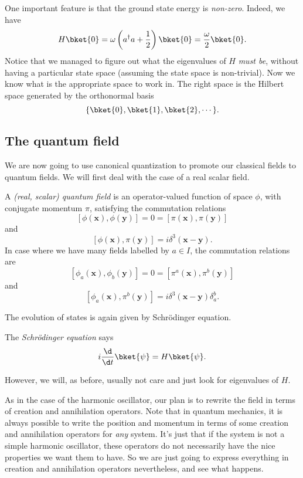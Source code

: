 \documentclass[a4paper]{article}
\begin{document}
One important feature is that the ground state energy is \emph{non-zero}. Indeed, we have
\[
  H \bket{0} = \omega\left(a^\dagger a + \frac{1}{2}\right)\bket{0} = \frac{\omega}{2} \bket{0}.
\]
Notice that we managed to figure out what the eigenvalues of $H$ \emph{must be}, without having a particular state space (assuming the state space is non-trivial). Now we know what is the appropriate space to work in. The right space is the Hilbert space generated by the orthonormal basis
\[
  \{\bket{0}, \bket{1}, \bket{2}, \cdots\}.
\]

\subsection{The quantum field}
We are now going to use canonical quantization to promote our classical fields to quantum fields. We will first deal with the case of a real scalar field.

\begin{defi}
  A \emph{(real, scalar) quantum field} is an operator-valued function of space $\phi$, with conjugate momentum $\pi$, satisfying the commutation relations
  \[
    [\phi(\mathbf{x}), \phi(\mathbf{y})] = 0 = [\pi(\mathbf{x}), \pi(\mathbf{y})]
  \]
  and
  \[
    [\phi(\mathbf{x}), \pi(\mathbf{y})] = i \delta^3(\mathbf{x} - \mathbf{y}).
  \]
  In case where we have many fields labelled by $a \in I$, the commutation relations are
  \[
    [\phi_a(\mathbf{x}), \phi_b(\mathbf{y})] = 0 = [\pi^a(\mathbf{x}), \pi^b(\mathbf{y})]
  \]
  and
  \[
    [\phi_a(\mathbf{x}), \pi^b(\mathbf{y})] = i \delta^3(\mathbf{x} - \mathbf{y}) \delta_a^b.
  \]
\end{defi}

The evolution of states is again given by Schr\"odinger equation.
\begin{defi}
  The \emph{Schr\"odinger equation} says
  \[
    i \frac{\d}{\d t}\bket{\psi} = H \bket{\psi}.
  \]
\end{defi}
However, we will, as before, usually not care and just look for eigenvalues of $H$.

As in the case of the harmonic oscillator, our plan is to rewrite the field in terms of creation and annihilation operators. Note that in quantum mechanics, it is always possible to write the position and momentum in terms of some creation and annihilation operators for \emph{any} system. It's just that if the system is not a simple harmonic oscillator, these operators do not necessarily have the nice properties we want them to have. So we are just going to express everything in creation and annihilation operators nevertheless, and see what happens.
\end{document}
